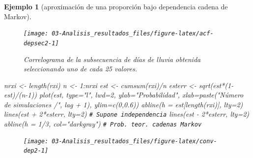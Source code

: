 \documentclass[
]{book}
\newenvironment{Shaded}{\begin{snugshade}}{\end{snugshade}}
\newcommand{\AttributeTok}[1]{\textcolor[rgb]{0.77,0.63,0.00}{#1}}
\newcommand{\CommentTok}[1]{\textcolor[rgb]{0.56,0.35,0.01}{\textit{#1}}}
\newcommand{\DecValTok}[1]{\textcolor[rgb]{0.00,0.00,0.81}{#1}}
\newcommand{\FloatTok}[1]{\textcolor[rgb]{0.00,0.00,0.81}{#1}}
\newcommand{\FunctionTok}[1]{\textcolor[rgb]{0.00,0.00,0.00}{#1}}
\newcommand{\NormalTok}[1]{#1}
\newcommand{\OtherTok}[1]{\textcolor[rgb]{0.56,0.35,0.01}{#1}}
\newcommand{\SpecialCharTok}[1]{\textcolor[rgb]{0.00,0.00,0.00}{#1}}
\newcommand{\StringTok}[1]{\textcolor[rgb]{0.31,0.60,0.02}{#1}}
\theoremstyle{break}
\newtheorem{example}{Ejemplo}[chapter]
\theoremstyle{nonumberplain}
\renewcommand{\CommentTok}[1]{\textcolor[rgb]{0.41,0.41,0.41}{\texttt{#1}}}
\begin{document}
\begin{example}[aproximación de una proporción bajo dependencia cadena de Markov]
\begin{figure}[!htb]
{\centering \texttt{[image: 03-Analisis\_resultados\_files/figure-latex/acf-depsec2-1]} 

}

\caption{Correlograma de la subsecuencia de días de lluvia obtenida seleccionando uno de cada 25 valores.}\label{fig:acf-depsec2}
\end{figure}

\begin{Shaded}
\begin{Highlighting}[]
\NormalTok{nrxi }\OtherTok{\textless{}{-}} \FunctionTok{length}\NormalTok{(rxi)}
\NormalTok{n }\OtherTok{\textless{}{-}} \DecValTok{1}\SpecialCharTok{:}\NormalTok{nrxi}
\NormalTok{est }\OtherTok{\textless{}{-}} \FunctionTok{cumsum}\NormalTok{(rxi)}\SpecialCharTok{/}\NormalTok{n}
\NormalTok{esterr }\OtherTok{\textless{}{-}} \FunctionTok{sqrt}\NormalTok{(est}\SpecialCharTok{*}\NormalTok{(}\DecValTok{1}\SpecialCharTok{{-}}\NormalTok{est)}\SpecialCharTok{/}\NormalTok{(n}\DecValTok{{-}1}\NormalTok{))}
\FunctionTok{plot}\NormalTok{(est, }\AttributeTok{type=}\StringTok{"l"}\NormalTok{, }\AttributeTok{lwd=}\DecValTok{2}\NormalTok{, }\AttributeTok{ylab=}\StringTok{"Probabilidad"}\NormalTok{, }
     \AttributeTok{xlab=}\FunctionTok{paste}\NormalTok{(}\StringTok{"Número de simulaciones /"}\NormalTok{, lag }\SpecialCharTok{+} \DecValTok{1}\NormalTok{), }\AttributeTok{ylim=}\FunctionTok{c}\NormalTok{(}\DecValTok{0}\NormalTok{,}\FloatTok{0.6}\NormalTok{))}
\FunctionTok{abline}\NormalTok{(}\AttributeTok{h =}\NormalTok{ est[}\FunctionTok{length}\NormalTok{(rxi)], }\AttributeTok{lty=}\DecValTok{2}\NormalTok{)}
\FunctionTok{lines}\NormalTok{(est }\SpecialCharTok{+} \DecValTok{2}\SpecialCharTok{*}\NormalTok{esterr, }\AttributeTok{lty=}\DecValTok{2}\NormalTok{) }\CommentTok{\# Supone independencia}
\FunctionTok{lines}\NormalTok{(est }\SpecialCharTok{{-}} \DecValTok{2}\SpecialCharTok{*}\NormalTok{esterr, }\AttributeTok{lty=}\DecValTok{2}\NormalTok{)}
\FunctionTok{abline}\NormalTok{(}\AttributeTok{h =} \DecValTok{1}\SpecialCharTok{/}\DecValTok{3}\NormalTok{, }\AttributeTok{col=}\StringTok{"darkgray"}\NormalTok{)     }\CommentTok{\# Prob. teor. cadenas Markov}
\end{Highlighting}
\end{Shaded}

\begin{figure}[!htb]

{\centering \texttt{[image: 03-Analisis\_resultados\_files/figure-latex/conv-dep2-1]} 

}


\end{figure}
\end{example}
\end{document}
